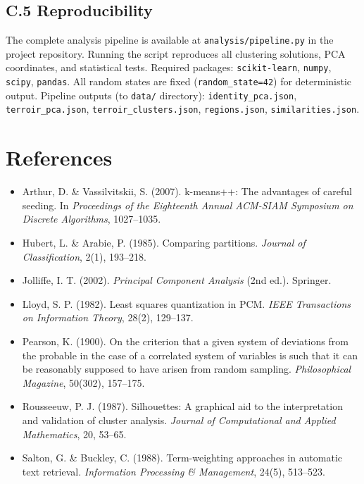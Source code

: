 \documentclass[11pt]{article}
\begin{document}
\subsection*{C.5 Reproducibility}
The complete analysis pipeline is available at \texttt{analysis/pipeline.py} in the project repository. Running the script reproduces all clustering solutions, PCA coordinates, and statistical tests. Required packages: \texttt{scikit-learn}, \texttt{numpy}, \texttt{scipy}, \texttt{pandas}. All random states are fixed (\texttt{random\_state=42}) for deterministic output. Pipeline outputs (to \texttt{data/} directory): \texttt{identity\_pca.json}, \texttt{terroir\_pca.json}, \texttt{terroir\_clusters.json}, \texttt{regions.json}, \texttt{similarities.json}.

\section*{References}

\begin{itemize}[leftmargin=2em,itemsep=0.2em]
\item Arthur, D. \& Vassilvitskii, S. (2007). k-means++: The advantages of careful seeding. In \emph{Proceedings of the Eighteenth Annual ACM-SIAM Symposium on Discrete Algorithms}, 1027--1035.
\item Hubert, L. \& Arabie, P. (1985). Comparing partitions. \emph{Journal of Classification}, 2(1), 193--218.
\item Jolliffe, I. T. (2002). \emph{Principal Component Analysis} (2nd ed.). Springer.
\item Lloyd, S. P. (1982). Least squares quantization in PCM. \emph{IEEE Transactions on Information Theory}, 28(2), 129--137.
\item Pearson, K. (1900). On the criterion that a given system of deviations from the probable in the case of a correlated system of variables is such that it can be reasonably supposed to have arisen from random sampling. \emph{Philosophical Magazine}, 50(302), 157--175.
\item Rousseeuw, P. J. (1987). Silhouettes: A graphical aid to the interpretation and validation of cluster analysis. \emph{Journal of Computational and Applied Mathematics}, 20, 53--65.
\item Salton, G. \& Buckley, C. (1988). Term-weighting approaches in automatic text retrieval. \emph{Information Processing \& Management}, 24(5), 513--523.
\end{itemize}
\end{document}
